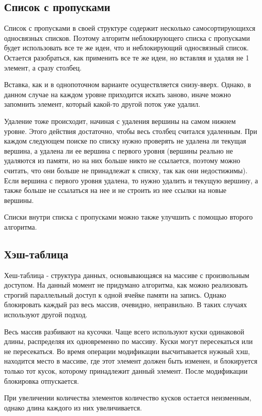 \documentclass[12pt]{article}
\begin{document}
{			\subsection{Список с пропусками}
				\par Список с пропусками в своей структуре содержит несколько самосортирующихся односвязных списков. Поэтому алгоритм неблокирующего списка с пропусками будет использовать все те же идеи, что и неблокирующий односвязный список. Остается разобраться, как применить все те же идеи, но вставляя и удаляя не 1 элемент, а сразу столбец. 
				\par Вставка, как и в однопоточном варианте осуществляется снизу-вверх. Однако, в данном случае на каждом уровне приходится искать заново, иначе можно запомнить элемент, который какой-то другой поток уже удалил.
				\par Удаление тоже происходит, начиная с удаления вершины на самом нижнем уровне. Этого действия достаточно, чтобы весь столбец считался удаленным. При каждом следующем поиске по списку нужно проверять не удалена ли текущая вершина, а удалена ли ее вершина с первого уровня (вершины реально не удаляются из памяти, но на них больше никто не ссылается, поэтому можно считать, что они больше не принадлежат к списку, так как они недостижимы). Если вершина с первого уровня удалена, то нужно удалить и текущую вершину, а также больше не ссылаться на нее и не строить из нее ссылки на новые вершины.
				\par Списки внутри списка с пропусками можно также улучшить с помощью второго алгоритма.
			\subsection{Хэш-таблица}
				\par Хеш-таблица - структура данных, основывающаяся на массиве с произвольным доступом. На данный момент не придумано алгоритма, как можно реализовать строгий параллельный доступ к одной ячейке памяти на запись. Однако блокировать каждый раз весь массив, очевидно, неправильно. В таких случаях используют другой подход.
				\par Весь массив разбивают на кусочки. Чаще всего используют куски одинаковой длины, распределяя их одновременно по массиву. Куски могут пересекаться или не пересекаться. Во время операции модификации высчитывается нужный хэш, находится место в массиве, где этот элемент должен быть изменен, и блокируется только тот кусок, которому принадлежит данный элемент. После модификации блокировка отпускается.
				\par При увеличении количества элементов количество кусков остается неизменным, однако длина каждого из них увеличивается.
				
}
\end{document}
